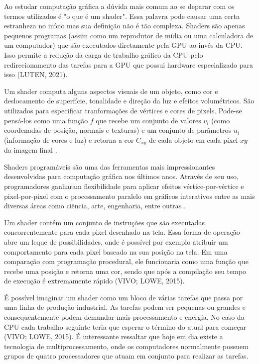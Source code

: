 Ao estudar computação gráfica a dúvida mais comum ao se deparar com os termos utilizados é "o que é um shader". Essa palavra pode causar uma certa estranheza no início mas sua definição não é tão complexa. Shaders são apenas pequenos programas (assim como um reprodutor de mídia ou uma calculadora de um computador) que são executados diretamente pela \acrshort{GPU} ao invés da \acrshort{CPU}. Isso permite a redução da carga de trabalho gráfico da \acrshort{CPU} pelo redirecionamento das tarefas para a \acrshort{GPU} que possui hardware especializado para isso (LUTEN, 2021)\nocite{openGLBook}.

Um shader computa alguns aspectos visuais de um objeto, como cor e deslocamento de superfície, tonalidade e direção da luz e efeitos volumétricos. São utilizados para especificar tranformações de vértices e cores de pixels. Pode-se pensá-los como uma função $ f $ que recebe um conjunto de valores $ v_i $ (como coordenadas de posição, normais e texturas) e um conjunto de parâmetros $ u_i $ (informação de cores e luz) e retorna a cor $ C_{xy} $ de cada objeto em cada pixel $ xy $ da imagem final \cite{fabio2005user}. 

Shaders programáveis são uma das ferramentas mais impressionantes desenvolvidas para computação gráfica nos últimos anos. Através de seu uso, programadores ganharam flexibilidade para aplicar efeitos vértice-por-vértice e pixel-por-pixel com o processamento paralelo em gráficos interativos entre as mais diversas áreas como ciência, arte, engenharia, entre outras \cite{bailey2007}.

Um shader contém um conjunto de instruções que são executadas concorrentemente para cada pixel desenhado na tela. Essa forma de operação abre um leque de possibilidades, onde é possível por exemplo atribuir um comportamento para cada pixel baseado na sua posição na tela. Em uma comparação com programação procedural, ele funcionaria como uma função que recebe uma posição e retorna uma cor, sendo que após a compilação seu tempo de execução é extremamente rápido (VIVO; LOWE, 2015)\nocite{bookOfShaders}.

É possível imaginar um shader como um bloco de várias tarefas que passa por uma linha de produção industrial. As tarefas podem ser pequenas ou grandes e consequentemente podem demandar mais processamento e energia. No caso da CPU cada trabalho seguinte teria que esperar o término do atual para começar (VIVO; LOWE, 2015)\nocite{bookOfShaders}. É interessante ressaltar que hoje em dia existe a tecnologia de multiprocessamento, onde os computadores normalmente possuem grupos de quatro processadores que atuam em conjunto para realizar as tarefas.

